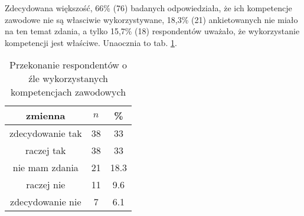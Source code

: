 

Zdecydowana większość, 66\% (76) badanych odpowiedziała, że ich kompetencje zawodowe nie są własciwie wykorzystywane, 18,3\% (21) ankietowanych nie miało na ten temat zdania, a tylko 15,7\% (18)  respondentów uważało, że wykorzystanie kompetencji jest właściwe. Unaocznia to tab. \ref{tab:Q21}.



\begin{table}[H]
\caption{Przekonanie respondentów o źle wykorzystanych kompetencjach zawodowych}
\centering
\begin{tabular}{ | c | c | c |}
\hline
zmienna & $n$ & \% \\
\hline
zdecydowanie tak  &  38  & 33 \\
\hline
raczej tak  &  38  & 33 \\
\hline
nie mam zdania  &  21  & 18.3 \\
\hline
raczej nie  &  11  & 9.6 \\
\hline
zdecydowanie nie  &  7  & 6.1\\
\hline
\end{tabular}
\label{tab:Q21}
\end{table}
